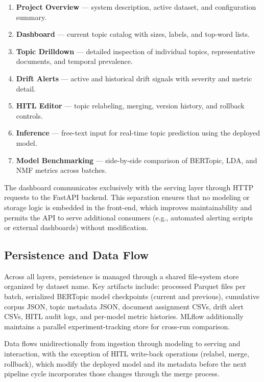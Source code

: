 \documentclass[conference]{IEEEtran}
\newcommand{\bertopic}{BERTopic\xspace}
\newcommand{\lda}{LDA\xspace}
\newcommand{\nmf}{NMF\xspace}
\newcommand{\hitl}{HITL\xspace}
\begin{document}
\begin{enumerate}[leftmargin=*,itemsep=1pt]
    \item \textbf{Project Overview} --- system description, active dataset, and configuration summary.
    \item \textbf{Dashboard} --- current topic catalog with sizes, labels, and top-word lists.
    \item \textbf{Topic Drilldown} --- detailed inspection of individual topics, representative documents, and temporal prevalence.
    \item \textbf{Drift Alerts} --- active and historical drift signals with severity and metric detail.
    \item \textbf{HITL Editor} --- topic relabeling, merging, version history, and rollback controls.
    \item \textbf{Inference} --- free-text input for real-time topic prediction using the deployed model.
    \item \textbf{Model Benchmarking} --- side-by-side comparison of \bertopic, \lda, and \nmf metrics across batches.
\end{enumerate}

The dashboard communicates exclusively with the serving layer through HTTP requests to the FastAPI backend. This separation ensures that no modeling or storage logic is embedded in the front-end, which improves maintainability and permits the API to serve additional consumers (e.g., automated alerting scripts or external dashboards) without modification.

\subsection{Persistence and Data Flow}
Across all layers, persistence is managed through a shared file-system store organized by dataset name. Key artifacts include: processed Parquet files per batch, serialized \bertopic model checkpoints (current and previous), cumulative corpus JSON, topic metadata JSON, document assignment CSVs, drift alert CSVs, \hitl audit logs, and per-model metric histories. MLflow additionally maintains a parallel experiment-tracking store for cross-run comparison.

Data flows unidirectionally from ingestion through modeling to serving and interaction, with the exception of \hitl write-back operations (relabel, merge, rollback), which modify the deployed model and its metadata before the next pipeline cycle incorporates those changes through the merge process.
\end{document}
